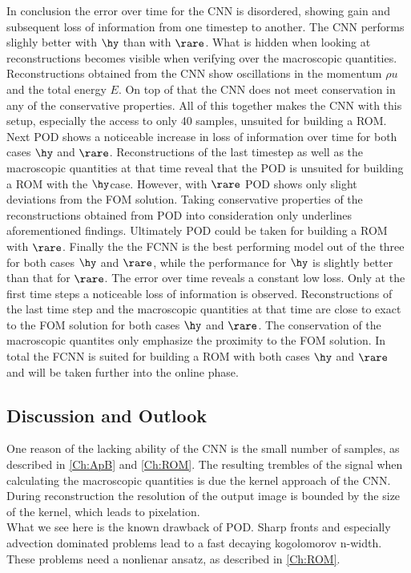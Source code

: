 In conclusion the error over time for the CNN is disordered, showing gain and subsequent loss of information from one timestep to another. The CNN performs slighly better with \(\hy\) than with \(\rare\). What is hidden when looking at reconstructions becomes visible when verifying over the macroscopic quantities. Reconstructions obtained from the CNN show oscillations in the momentum \(\rho u\) and the total energy \(E\). On top of that the CNN does not meet conservation in any of the conservative properties. All of this together makes the CNN with this setup, especially the access to only 40 samples, unsuited for building a ROM. Next POD shows a noticeable increase in loss of information over time for both cases \(\hy\) and \(\rare\). Reconstructions of the last timestep as well as the macroscopic quantities at that time reveal that the POD is unsuited for building a ROM with the \(\hy\)case. However, with \(\rare\) POD shows only slight deviations from the FOM solution. Taking conservative properties of the reconstructions obtained from POD into consideration only underlines aforementioned findings. Ultimately POD could be taken for building a ROM with \(\rare\). Finally the the FCNN is the best performing model out of the three for both cases \(\hy\) and \(\rare\), while the performance for \(\hy\) is slightly better than that for \(\rare\). The error over time reveals a constant low loss. Only at the first time steps a noticeable loss of information is observed. Reconstructions of the last time step and the macroscopic quantities at that time are close to exact to the FOM solution for both cases \(\hy\) and \(\rare\). The conservation of the macroscopic quantites only emphasize the proximity to the FOM solution. In total the FCNN is suited for building a ROM with both cases \(\hy\) and \(\rare\) and will be taken further into the online phase.\\
\subsection{Discussion and Outlook}
 One reason of the lacking ability of the CNN is the small number of samples, as described in \cref{Ch:ApB} and \cref{Ch:ROM}. The resulting trembles of the signal when calculating the macroscopic quantities is due the kernel approach of the CNN. During reconstruction the resolution of the output image is bounded by the size of the kernel, which leads to pixelation.\\
  What we see here is the known drawback of POD. Sharp fronts and especially advection dominated problems lead to a fast decaying kogolomorov n-width. These problems need a nonlienar ansatz, as described in \cref{Ch:ROM}.